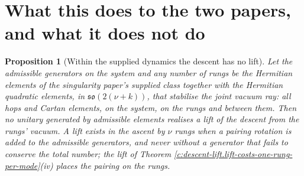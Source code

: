 \documentclass[11pt]{article}
\newtheorem{proposition}[theorem]{Proposition}
\theoremstyle{definition}
\theoremstyle{plain}
\begin{document}
\section{What this does to the two papers, and what it does not do}

\begin{proposition}[Within the supplied dynamics the descent has no lift]\label{c:descent-lift.within-supplied-dynamics-descent-has-no}
Let the admissible generators on the system and any number of rungs be the Hermitian elements of the singularity paper's supplied class together with the Hermitian quadratic elements, in $\mathfrak{so}(2(\nu + k))$, that stabilise the joint vacuum ray: all hops and Cartan elements, on the system, on the rungs and between them. Then no unitary generated by admissible elements realises a lift of the descent from the rungs' vacuum. A lift exists in the ascent by $\nu$ rungs when a pairing rotation is added to the admissible generators, and never without a generator that fails to conserve the total number; the lift of Theorem \ref{c:descent-lift.lift-costs-one-rung-per-mode}(iv) places the pairing on the rungs.
\end{proposition}
\end{document}
